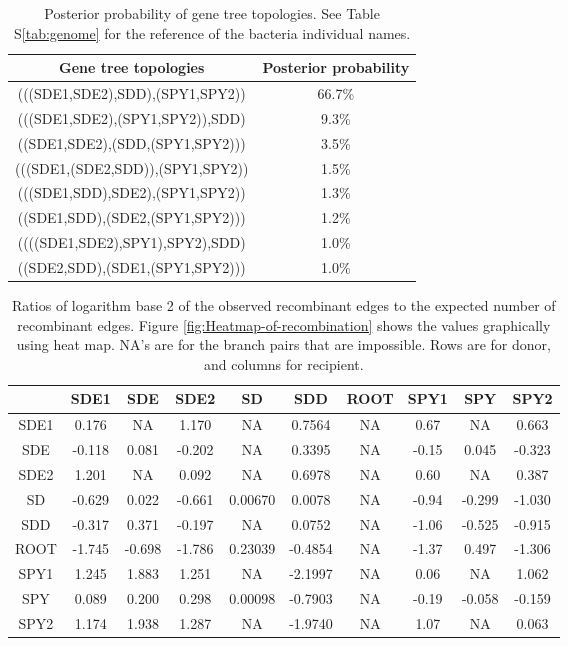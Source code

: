\documentclass[english]{article}
\providecommand{\tabularnewline}{\\}
\begin{document}
\begin{table}
\caption{\label{tab:Gene-tree-topologies}Posterior probability of gene tree
topologies. See Table S\ref{tab:genome} for the reference of the bacteria
individual names.}
\noindent \begin{centering}
\begin{tabular}{cc}
\hline 
Gene tree topologies & Posterior probability\tabularnewline
\hline
(((SDE1,SDE2),SDD),(SPY1,SPY2)) & 66.7\%\tabularnewline
(((SDE1,SDE2),(SPY1,SPY2)),SDD) & 9.3\%\tabularnewline
((SDE1,SDE2),(SDD,(SPY1,SPY2))) & 3.5\%\tabularnewline
(((SDE1,(SDE2,SDD)),(SPY1,SPY2)) & 1.5\%\tabularnewline
(((SDE1,SDD),SDE2),(SPY1,SPY2)) & 1.3\%\tabularnewline
((SDE1,SDD),(SDE2,(SPY1,SPY2))) & 1.2\%\tabularnewline
((((SDE1,SDE2),SPY1),SPY2),SDD) & 1.0\%\tabularnewline
((SDE2,SDD),(SDE1,(SPY1,SPY2))) & 1.0\%\tabularnewline
\hline
\end{tabular}
\par\end{centering}
\end{table}
\clearpage{}

\begin{table}
\caption{\label{tab:heatmap}Ratios of logarithm base 2 of the observed
recombinant edges to the expected number of recombinant edges.  Figure
\ref{fig:Heatmap-of-recombination} shows the values graphically using heat map.
NA's are for the branch pairs that are impossible. Rows are for donor, and
columns for recipient.}
\noindent \centering{}\begin{tabular}{cccccccccc}
\hline
& SDE1 & SDE & SDE2 & SD & SDD & ROOT & SPY1 & SPY & SPY2 \tabularnewline
\hline
SDE1& 0.176  &   NA  &1.170  &    NA & 0.7564  & NA & 0.67 &    NA & 0.663\tabularnewline
SDE & -0.118 & 0.081 &-0.202 &     NA&  0.3395 &  NA& -0.15&  0.045& -0.323\tabularnewline
SDE2& 1.201  &   NA  &0.092  &    NA & 0.6978  & NA & 0.60 &    NA & 0.387\tabularnewline
SD  & -0.629 & 0.022 &-0.661 &0.00670&  0.0078 &  NA& -0.94& -0.299& -1.030\tabularnewline
SDD & -0.317 & 0.371 &-0.197 &     NA&  0.0752 &  NA& -1.06& -0.525& -0.915\tabularnewline
ROOT& -1.745 &-0.698 &-1.786 &0.23039& -0.4854 &  NA& -1.37&  0.497& -1.306\tabularnewline
SPY1& 1.245  &1.883  &1.251  &    NA &-2.1997  & NA & 0.06 &    NA & 1.062\tabularnewline
SPY & 0.089  &0.200  &0.298 &0.00098 &-0.7903  & NA &-0.19 &-0.058 &-0.159\tabularnewline
SPY2& 1.174  &1.938  &1.287  &    NA &-1.9740  & NA & 1.07 &    NA & 0.063\tabularnewline
\hline
\end{tabular}
\end{table}
\clearpage{}
\end{document}

